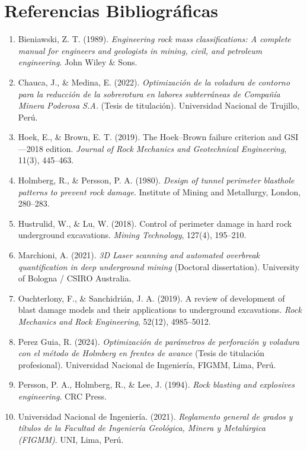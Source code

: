 \documentclass[12pt,a4paper,oneside]{book}
\begin{document}
\chapter*{Referencias Bibliográficas}
\begin{enumerate}
    \item Bieniawski, Z. T. (1989). \textit{Engineering rock mass classifications: A complete manual for engineers and geologists in mining, civil, and petroleum engineering}. John Wiley \& Sons.
    \item Chauca, J., \& Medina, E. (2022). \textit{Optimización de la voladura de contorno para la reducción de la sobrerotura en labores subterráneas de Compañía Minera Poderosa S.A.} (Tesis de titulación). Universidad Nacional de Trujillo, Perú.
    \item Hoek, E., \& Brown, E. T. (2019). The Hoek–Brown failure criterion and GSI—2018 edition. \textit{Journal of Rock Mechanics and Geotechnical Engineering}, 11(3), 445–463.
    \item Holmberg, R., \& Persson, P. A. (1980). \textit{Design of tunnel perimeter blasthole patterns to prevent rock damage}. Institute of Mining and Metallurgy, London, 280–283.
    \item Hustrulid, W., \& Lu, W. (2018). Control of perimeter damage in hard rock underground excavations. \textit{Mining Technology}, 127(4), 195–210.
    \item Marchioni, A. (2021). \textit{3D Laser scanning and automated overbreak quantification in deep underground mining} (Doctoral dissertation). University of Bologna / CSIRO Australia.
    \item Ouchterlony, F., \& Sanchidrián, J. A. (2019). A review of development of blast damage models and their applications to underground excavations. \textit{Rock Mechanics and Rock Engineering}, 52(12), 4985–5012.
    \item Perez Guia, R. (2024). \textit{Optimización de parámetros de perforación y voladura con el método de Holmberg en frentes de avance} (Tesis de titulación profesional). Universidad Nacional de Ingeniería, FIGMM, Lima, Perú.
    \item Persson, P. A., Holmberg, R., \& Lee, J. (1994). \textit{Rock blasting and explosives engineering}. CRC Press.
    \item Universidad Nacional de Ingeniería. (2021). \textit{Reglamento general de grados y títulos de la Facultad de Ingeniería Geológica, Minera y Metalúrgica (FIGMM)}. UNI, Lima, Perú.
\end{enumerate}
\end{document}

